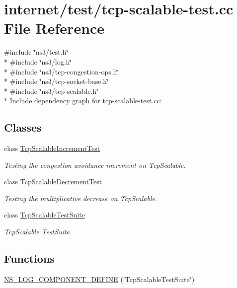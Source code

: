 \hypertarget{tcp-scalable-test_8cc}{}\section{internet/test/tcp-\/scalable-\/test.cc File Reference}
\label{tcp-scalable-test_8cc}
{\ttfamily \#include \char`\"{}ns3/test.\+h\char`\"{}}\\*
{\ttfamily \#include \char`\"{}ns3/log.\+h\char`\"{}}\\*
{\ttfamily \#include \char`\"{}ns3/tcp-\/congestion-\/ops.\+h\char`\"{}}\\*
{\ttfamily \#include \char`\"{}ns3/tcp-\/socket-\/base.\+h\char`\"{}}\\*
{\ttfamily \#include \char`\"{}ns3/tcp-\/scalable.\+h\char`\"{}}\\*
Include dependency graph for tcp-\/scalable-\/test.cc\+:
\subsection*{Classes}
\begin{DoxyCompactItemize}
\item 
class \hyperlink{classTcpScalableIncrementTest}{Tcp\+Scalable\+Increment\+Test}
\begin{DoxyCompactList}\small\item\em Testing the congestion avoidance increment on Tcp\+Scalable. \end{DoxyCompactList}\item 
class \hyperlink{classTcpScalableDecrementTest}{Tcp\+Scalable\+Decrement\+Test}
\begin{DoxyCompactList}\small\item\em Testing the multiplicative decrease on Tcp\+Scalable. \end{DoxyCompactList}\item 
class \hyperlink{classTcpScalableTestSuite}{Tcp\+Scalable\+Test\+Suite}
\begin{DoxyCompactList}\small\item\em Tcp\+Scalable Test\+Suite. \end{DoxyCompactList}\end{DoxyCompactItemize}
\subsection*{Functions}
\begin{DoxyCompactItemize}
\item 
\hyperlink{tcp-scalable-test_8cc_a0846456018ec766c03678707c3a31f36}{N\+S\+\_\+\+L\+O\+G\+\_\+\+C\+O\+M\+P\+O\+N\+E\+N\+T\+\_\+\+D\+E\+F\+I\+NE} (\char`\"{}Tcp\+Scalable\+Test\+Suite\char`\"{})
\end{DoxyCompactItemize}
